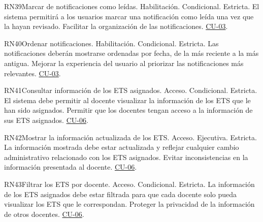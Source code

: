 \begin{BussinesRule}{RN39}{Marcar de notificaciones como leídas.}
    \BRitem[Tipo:] Habilitación.
    \BRitem[Clase:] Condicional.
    \BRitem[Nivel:] Estricta.
    \BRitem[Descripción:] El sistema permitirá a los usuarios marcar una notificación como leída una vez que la hayan revisado.
    \BRitem[Motivación:] Facilitar la organización de las notificaciones.
     \hyperlink{CU-03}{CU-03}.
    \end{BussinesRule}

\begin{BussinesRule}{RN40}{Ordenar notificaciones.}
    \BRitem[Tipo:] Habilitación.
    \BRitem[Clase:] Condicional.
    \BRitem[Nivel:] Estricta.
    \BRitem[Descripción:] Las notificaciones deberán mostrarse ordenadas por fecha, de la más reciente a la más antigua.
    \BRitem[Motivación:] Mejorar la experiencia del usuario al priorizar las notificaciones más relevantes.
     \hyperlink{CU-03}{CU-03}.
    \end{BussinesRule}

\begin{BussinesRule}{RN41}{Consultar información de los ETS asignados.}
    \BRitem[Tipo:] Acceso.
    \BRitem[Clase:] Condicional.
    \BRitem[Nivel:] Estricta.
    \BRitem[Descripción:] El sistema debe permitir al docente visualizar la información de los ETS que le han sido asignados.
    \BRitem[Motivación:] Permitir que los docentes tengan acceso a la información de sus ETS asignados. 
     \hyperlink{CU-06}{CU-06}.
    \end{BussinesRule}

\begin{BussinesRule}{RN42}{Mostrar la información actualizada de los ETS.}
    \BRitem[Tipo:] Acceso.
    \BRitem[Clase:] Ejecutiva.
    \BRitem[Nivel:] Estricta.
    \BRitem[Descripción:] La información mostrada debe estar actualizada y reflejar cualquier cambio administrativo relacionado con los ETS asignados.
    \BRitem[Motivación:] Evitar inconsistencias en la información presentada al docente.
     \hyperlink{CU-06}{CU-06}.
    \end{BussinesRule}

\begin{BussinesRule}{RN43}{Filtrar los ETS por docente.}
    \BRitem[Tipo:] Acceso.
    \BRitem[Clase:] Condicional.
    \BRitem[Nivel:] Estricta.
    \BRitem[Descripción:] La información de los ETS asignados debe estar filtrada para que cada docente solo pueda visualizar los ETS que le correspondan.
    \BRitem[Motivación:] Proteger la privacidad de la información de otros docentes.
     \hyperlink{CU-06}{CU-06}.
    \end{BussinesRule}

